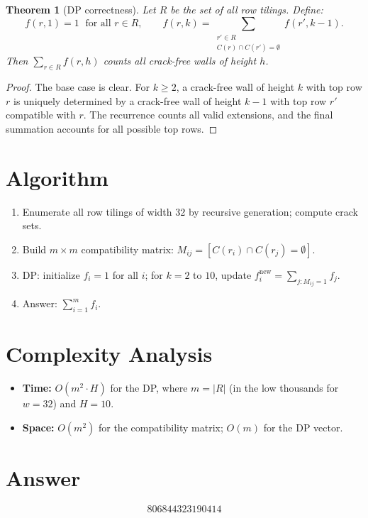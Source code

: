 \documentclass[12pt]{article}
\newtheorem{theorem}{Theorem}
\begin{document}
\begin{theorem}[DP correctness]
Let $R$ be the set of all row tilings. Define:
\[
f(r, 1) = 1 \;\text{ for all } r \in R, \qquad f(r, k) = \sum_{\substack{r' \in R \\ C(r)\cap C(r')=\emptyset}} f(r', k{-}1).
\]
Then $\sum_{r \in R} f(r, h)$ counts all crack-free walls of height $h$.
\end{theorem}

\begin{proof}
The base case is clear. For $k \geq 2$, a crack-free wall of height $k$ with top row $r$ is uniquely determined by a crack-free wall of height $k{-}1$ with top row $r'$ compatible with $r$. The recurrence counts all valid extensions, and the final summation accounts for all possible top rows.
\end{proof}

\section{Algorithm}

\begin{enumerate}
\item Enumerate all row tilings of width 32 by recursive generation; compute crack sets.
\item Build $m \times m$ compatibility matrix: $M_{ij} = [C(r_i) \cap C(r_j) = \emptyset]$.
\item DP: initialize $f_i = 1$ for all $i$; for $k = 2$ to $10$, update $f_i^{\text{new}} = \sum_{j: M_{ij}=1} f_j$.
\item Answer: $\sum_{i=1}^{m} f_i$.
\end{enumerate}

\section{Complexity Analysis}

\begin{itemize}
\item \textbf{Time:} $O(m^2 \cdot H)$ for the DP, where $m = |R|$ (in the low thousands for $w=32$) and $H = 10$.
\item \textbf{Space:} $O(m^2)$ for the compatibility matrix; $O(m)$ for the DP vector.
\end{itemize}

\section{Answer}

\[
\boxed{806844323190414}
\]
\end{document}
